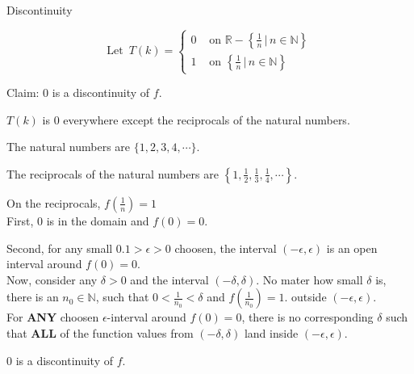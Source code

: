\documentclass{ximera}
\begin{document}
\begin{example}  Discontinuity


\[
\text{Let } \, T(k) = 
\begin{cases}
  0 & \text{ on } \mathbb{R} - \left\{ \frac{1}{n} \, | \, n \in \mathbb{N}     \right\} \\
  1  & \text{ on } \left\{ \frac{1}{n} \, | \, n \in \mathbb{N}     \right\}
\end{cases}
\]



Claim: $0$ is a discontinuity of $f$. \\



\begin{explanation}

$T(k)$ is $0$ everywhere except the reciprocals of the natural numbers.

The natural numbers are $\{ 1, 2, 3, 4, \cdots \}$.

The reciprocals of the natural numbers are $\left\{ 1, \frac{1}{2}, \frac{1}{3}, \frac{1}{4}, \cdots \right\}$.

On the reciprocals, $f\left(\frac{1}{n}\right) = 1$ \\



First, $0$ is in the domain and $f(0) = 0$.

Second, for any small $0.1 > \epsilon > 0$ choosen, the interval $(-\epsilon, \epsilon)$ is an open interval around $f(0) = 0$. \\



Now, consider any $\delta > 0$ and the interval $(-\delta, \delta)$. No mater how small $\delta$ is, there is an $n_0 \in \mathbb{N}$, such that $0 < \frac{1}{n_0} < \delta$ and $f\left(\frac{1}{n_0}\right) = 1$. outside $(-\epsilon, \epsilon)$. \\




For \textbf{\textcolor{red!50!blue!90!black}{ANY}} choosen $\epsilon$-interval around $f(0)= 0$, there is no corresponding $\delta$ such that \textbf{\textcolor{red!50!blue!90!black}{ALL}} of the function values from  $(-\delta, \delta)$ land inside $(-\epsilon, \epsilon)$.


$0$ is a discontinuity of $f$.

\end{explanation}

\end{example}
\end{document}
